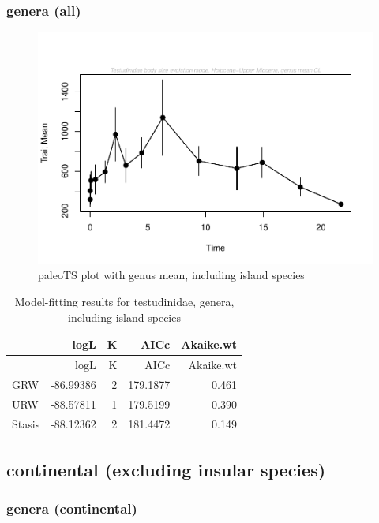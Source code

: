 \documentclass[]{article}
\begin{document}
\subsubsection{genera (all)}\label{genera-all}

\begin{figure}[htbp]
\centering
\includegraphics{MA_JJ_files/figure-latex/paleoTS plot with genus mean, including island species-1.pdf}
\caption{paleoTS plot with genus mean, including island species}
\end{figure}

\begin{longtable}[]{@{}lrrrr@{}}
\caption{Model-fitting results for testudinidae, genera, including
island species}\tabularnewline
\toprule
& logL & K & AICc & Akaike.wt\tabularnewline
\midrule
\endfirsthead
\toprule
& logL & K & AICc & Akaike.wt\tabularnewline
\midrule
\endhead
GRW & -86.99386 & 2 & 179.1877 & 0.461\tabularnewline
URW & -88.57811 & 1 & 179.5199 & 0.390\tabularnewline
Stasis & -88.12362 & 2 & 181.4472 & 0.149\tabularnewline
\bottomrule
\end{longtable}

\newpage

\subsection{continental (excluding insular
species)}\label{continental-excluding-insular-species}

\subsubsection{genera (continental)}\label{genera-continental}
\end{document}
